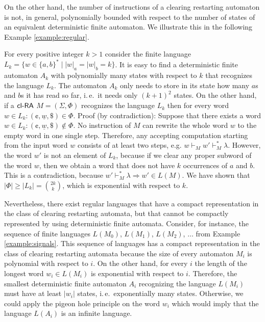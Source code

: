 On the other hand, the number of instructions of a clearing restarting automaton is not, in general, polynomially bounded with respect to the number of states of an equivalent deterministic finite automaton. We illustrate this in the following Example \ref{example:regular}.

\begin{example}\label{example:regular}
For every positive integer $k > 1$ consider the finite language $L_k = \{ w \in \{a, b\}^* \mid |w|_a = |w|_b = k \}$. It is easy to find a deterministic finite automaton $A_k$ with polynomially many states with respect to $k$ that recognizes the language $L_k$. The automaton $A_k$ only needs to store in its state how many $a$s and $b$s it has read so far, i.\,e.\ it needs only $(k+1)^2$ states. On the other hand, if a $\mbox{\sf cl-RA\/}$ $M = (\Sigma, \Phi)$ recognizes the language $L_k$ then for every word $w \in L_k: (\cent, \underline{w}, \$) \in \Phi$. Proof (by contradiction): Suppose that there exists a word $w \in L_k: (\cent, \underline{w}, \$) \notin \Phi$. No instruction of $M$ can rewrite the whole word $w$ to the empty word in one single step. Therefore, any accepting computation starting from the input word $w$ consists of at least two steps, e.g. $w \vdash_M w' \vdash_M^* \lambda$.  However, the word $w'$ is not an element of $L_k$, because if we clear any proper subword of the word $w$, then we obtain a word that does not have $k$ occurrences of $a$ and $b$. This is a contradiction, because $w' \vdash_M^* \lambda \Rightarrow w' \in L(M)$. We have shown that $|\Phi| \ge |L_k| = \binom{2k}{k}$, which is exponential with respect to $k$.
\end{example}

Nevertheless, there exist regular languages that have a compact representation in the class of clearing restarting automata, but that cannot be compactly represented by using deterministic finite automata. Consider, for instance, the sequence of finite languages $L(M_0)$, $L(M_1)$, $L(M_2)$, $\ldots$ from Example \ref{example:signals}. This sequence of languages has a compact representation in the class of clearing restarting automata because the size of every automaton $M_i$ is polynomial with respect to $i$. On the other hand, for every $i$ the length of the longest word $w_i \in L(M_i)$ is exponential with respect to $i$. Therefore, the smallest deterministic finite automaton $A_i$ recognizing the language $L(M_i)$ must have at least $|w_i|$ states, i.\,e.\ exponentially many states. Otherwise, we could apply the pigeon hole principle on the word $w_i$ which would imply that the language $L(A_i)$ is an infinite language.


